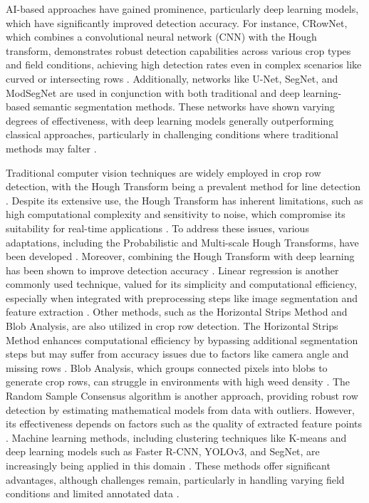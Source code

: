 \documentclass[conference]{IEEEtran}
\begin{document}
AI-based approaches have gained prominence, particularly deep learning models, which have significantly improved detection accuracy. For instance, CRowNet, which combines a convolutional neural network (CNN) with the Hough transform, demonstrates robust detection capabilities across various crop types and field conditions, achieving high detection rates even in complex scenarios like curved or intersecting rows \cite{b8,b14}. Additionally, networks like U-Net, SegNet, and ModSegNet are used in conjunction with both traditional and deep learning-based semantic segmentation methods. These networks have shown varying degrees of effectiveness, with deep learning models generally outperforming classical approaches, particularly in challenging conditions where traditional methods may falter \cite{b5,b13}.

Traditional computer vision techniques are widely employed in crop row detection, with the Hough Transform being a prevalent method for line detection \cite{b2,b15}. Despite its extensive use, the Hough Transform has inherent limitations, such as high computational complexity and sensitivity to noise, which compromise its suitability for real-time applications \cite{b2}. To address these issues, various adaptations, including the Probabilistic and Multi-scale Hough Transforms, have been developed \cite{b2}. Moreover, combining the Hough Transform with deep learning has been shown to improve detection accuracy \cite{b8}. Linear regression is another commonly used technique, valued for its simplicity and computational efficiency, especially when integrated with preprocessing steps like image segmentation and feature extraction \cite{b2,b3}. Other methods, such as the Horizontal Strips Method and Blob Analysis, are also utilized in crop row detection. The Horizontal Strips Method enhances computational efficiency by bypassing additional segmentation steps but may suffer from accuracy issues due to factors like camera angle and missing rows \cite{b2}. Blob Analysis, which groups connected pixels into blobs to generate crop rows, can struggle in environments with high weed density \cite{b2}. The Random Sample Consensus algorithm is another approach, providing robust row detection by estimating mathematical models from data with outliers. However, its effectiveness depends on factors such as the quality of extracted feature points \cite{b2}. Machine learning methods, including clustering techniques like K-means and deep learning models such as Faster R-CNN, YOLOv3, and SegNet, are increasingly being applied in this domain \cite{b2,b5}. These methods offer significant advantages, although challenges remain, particularly in handling varying field conditions and limited annotated data \cite{b2,b5}.
\end{document}
